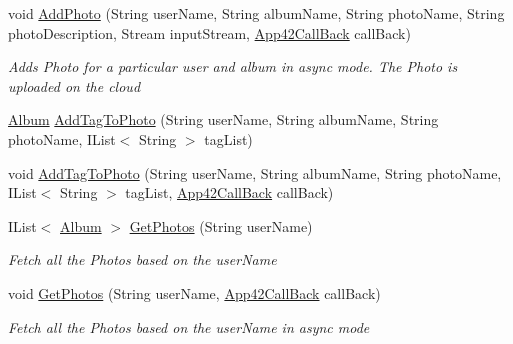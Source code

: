 \begin{DoxyCompactItemize}
void \hyperlink{classcom_1_1shephertz_1_1app42_1_1paas_1_1sdk_1_1csharp_1_1gallery_1_1_photo_service_a9d48fac98ff04f2be0020fd1352dab82}{Add\+Photo} (String user\+Name, String album\+Name, String photo\+Name, String photo\+Description, Stream input\+Stream, \hyperlink{interfacecom_1_1shephertz_1_1app42_1_1paas_1_1sdk_1_1csharp_1_1_app42_call_back}{App42\+Call\+Back} call\+Back)
\begin{DoxyCompactList}\small\item\em Adds Photo for a particular user and album in async mode. The Photo is uploaded on the cloud \end{DoxyCompactList}\item 
\hyperlink{classcom_1_1shephertz_1_1app42_1_1paas_1_1sdk_1_1csharp_1_1gallery_1_1_album}{Album} \hyperlink{classcom_1_1shephertz_1_1app42_1_1paas_1_1sdk_1_1csharp_1_1gallery_1_1_photo_service_a1361b0eaa083f2a8733f5246c9cdffd8}{Add\+Tag\+To\+Photo} (String user\+Name, String album\+Name, String photo\+Name, I\+List$<$ String $>$ tag\+List)
\item 
void \hyperlink{classcom_1_1shephertz_1_1app42_1_1paas_1_1sdk_1_1csharp_1_1gallery_1_1_photo_service_a70b1e1274dba5ce6b2899fde933b9edf}{Add\+Tag\+To\+Photo} (String user\+Name, String album\+Name, String photo\+Name, I\+List$<$ String $>$ tag\+List, \hyperlink{interfacecom_1_1shephertz_1_1app42_1_1paas_1_1sdk_1_1csharp_1_1_app42_call_back}{App42\+Call\+Back} call\+Back)
\item 
I\+List$<$ \hyperlink{classcom_1_1shephertz_1_1app42_1_1paas_1_1sdk_1_1csharp_1_1gallery_1_1_album}{Album} $>$ \hyperlink{classcom_1_1shephertz_1_1app42_1_1paas_1_1sdk_1_1csharp_1_1gallery_1_1_photo_service_a34f84f9576fd8fbd1612dbf387e0951f}{Get\+Photos} (String user\+Name)
\begin{DoxyCompactList}\small\item\em Fetch all the Photos based on the user\+Name \end{DoxyCompactList}\item 
void \hyperlink{classcom_1_1shephertz_1_1app42_1_1paas_1_1sdk_1_1csharp_1_1gallery_1_1_photo_service_ab7868a3426eb7c34d85311afaf88ee75}{Get\+Photos} (String user\+Name, \hyperlink{interfacecom_1_1shephertz_1_1app42_1_1paas_1_1sdk_1_1csharp_1_1_app42_call_back}{App42\+Call\+Back} call\+Back)
\begin{DoxyCompactList}\small\item\em Fetch all the Photos based on the user\+Name in async mode \end{DoxyCompactList}\item 

\end{DoxyCompactItemize}
